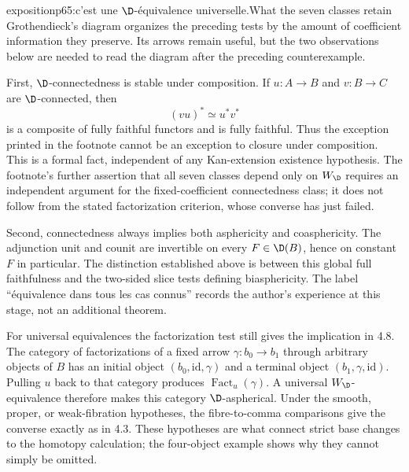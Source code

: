 \begin{dcomment}{exposition}{p65:c'est une $\D$-équivalence universelle.}{What the seven classes retain}
Grothendieck's diagram organizes the preceding tests by the amount of coefficient information they preserve. Its arrows remain useful, but the two observations below are needed to read the diagram after the preceding counterexample.

First, $\D$-connectedness is stable under composition. If $u:A\to B$ and $v:B\to C$ are $\D$-connected, then
\[
       (vu)^*\simeq u^*v^*
\]
is a composite of fully faithful functors and is fully faithful. Thus the exception printed in the footnote cannot be an exception to closure under composition. This is a formal fact, independent of any Kan-extension existence hypothesis. The footnote's further assertion that all seven classes depend only on $W_\D$ requires an independent argument for the fixed-coefficient connectedness class; it does not follow from the stated factorization criterion, whose converse has just failed.

Second, connectedness always implies both asphericity and coasphericity. The adjunction unit and counit are invertible on every $F\in\D(B)$, hence on constant $F$ in particular. The distinction established above is between this global full faithfulness and the two-sided slice tests defining biasphericity. The label ``équivalence dans tous les cas connus'' records the author's experience at this stage, not an additional theorem.

For universal equivalences the factorization test still gives the implication in 4.8. The category of factorizations of a fixed arrow $\gamma:b_0\to b_1$ through arbitrary objects of $B$ has an initial object $(b_0,\mathrm{id},\gamma)$ and a terminal object $(b_1,\gamma,\mathrm{id})$. Pulling $u$ back to that category produces $\operatorname{Fact}_u(\gamma)$. A universal $W_\D$-equivalence therefore makes this category $\D$-aspherical. Under the smooth, proper, or weak-fibration hypotheses, the fibre-to-comma comparisons give the converse exactly as in 4.3. These hypotheses are what connect strict base changes to the homotopy calculation; the four-object example shows why they cannot simply be omitted.
\end{dcomment}



